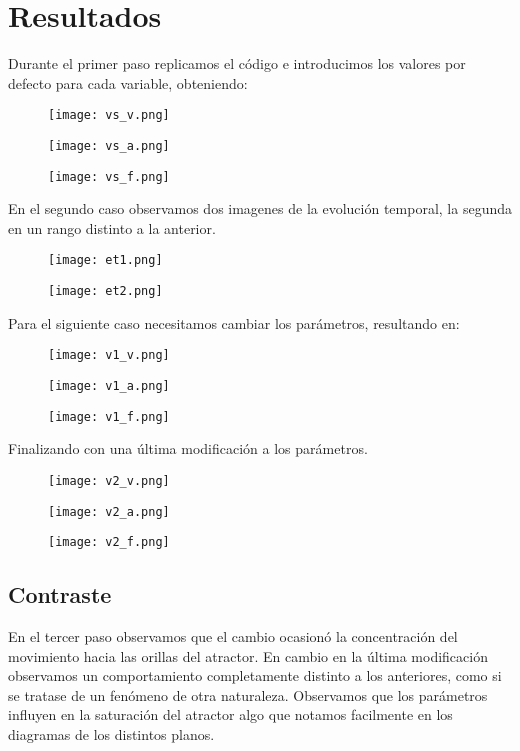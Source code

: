 \documentclass{article}
\begin{document}
\section{Resultados}
Durante el primer paso replicamos el código e introducimos los valores por defecto para cada variable, obteniendo:\\
\begin{figure}[H]
	\centering
    \texttt{[image: vs\_v.png]}
\end{figure}
\begin{figure}[H]
	\centering
    \texttt{[image: vs\_a.png]}
\end{figure}
\begin{figure}[H]
	\centering
    \texttt{[image: vs\_f.png]}
\end{figure}
En el segundo caso observamos dos imagenes de la evolución temporal, la segunda en un rango distinto a la anterior.\\
\begin{figure}[H]
	\centering
    \texttt{[image: et1.png]}
\end{figure}\begin{figure}[H]
	\centering
    \texttt{[image: et2.png]}
\end{figure}
Para el siguiente caso necesitamos cambiar los parámetros, resultando en:\\
\begin{figure}[H]
	\centering
    \texttt{[image: v1\_v.png]}
\end{figure}
\begin{figure}[H]
	\centering
    \texttt{[image: v1\_a.png]}
\end{figure}
\begin{figure}[H]
	\centering
    \texttt{[image: v1\_f.png]}
\end{figure}
Finalizando con una última modificación a los parámetros.
\begin{figure}[H]
	\centering
    \texttt{[image: v2\_v.png]}
\end{figure}
\begin{figure}[H]
	\centering
    \texttt{[image: v2\_a.png]}
\end{figure}
\begin{figure}[H]
	\centering
    \texttt{[image: v2\_f.png]}
\end{figure}
\subsection{Contraste}
En el tercer paso observamos que el cambio ocasionó la concentración del movimiento hacia las orillas del atractor. En cambio en la última modificación observamos un comportamiento completamente distinto a los anteriores, como si se tratase de un fenómeno de otra naturaleza. Observamos que los parámetros influyen en la saturación del atractor algo que notamos facilmente en los diagramas de los distintos planos.
\end{document}
